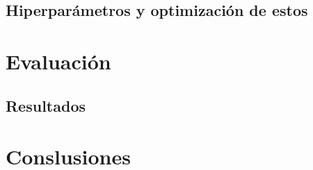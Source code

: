 \documentclass[runningheads]{llncs}
\begin{document}
\subsection{Hiperparámetros y optimización de estos}

\section{Evaluación}

\subsection{Resultados}

\section{Conslusiones}
\end{document}
